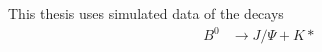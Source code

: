 This thesis uses simulated data of the decays 
\begin{align*}
    B^0 &\rightarrow J/\Psi + K* 
\end{align*}